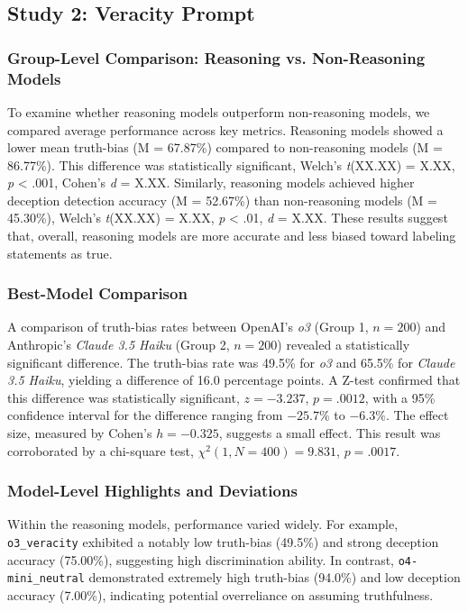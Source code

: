 \documentclass{article}
\begin{document}
\subsection{Study 2: Veracity Prompt}

\subsubsection{Group-Level Comparison: Reasoning vs. Non-Reasoning Models}

To examine whether reasoning models outperform non-reasoning models, we compared average performance across key metrics. Reasoning models showed a lower mean truth-bias (M = 67.87\%) compared to non-reasoning models (M = 86.77\%). This difference was statistically significant, Welch's \textit{t}(XX.XX) = X.XX, \textit{p} < .001, Cohen's \textit{d} = X.XX. Similarly, reasoning models achieved higher deception detection accuracy (M = 52.67\%) than non-reasoning models (M = 45.30\%), Welch's \textit{t}(XX.XX) = X.XX, \textit{p} < .01, \textit{d} = X.XX. These results suggest that, overall, reasoning models are more accurate and less biased toward labeling statements as true.

\subsubsection{Best-Model Comparison}

A comparison of truth-bias rates between OpenAI's \textit{o3} (Group 1, $n = 200$) and Anthropic's \textit{Claude 3.5 Haiku} (Group 2, $n = 200$) revealed a statistically significant difference. The truth-bias rate was 49.5\% for \textit{o3} and 65.5\% for \textit{Claude 3.5 Haiku}, yielding a difference of 16.0 percentage points. A Z-test confirmed that this difference was statistically significant, $z = -3.237$, $p = .0012$, with a 95\% confidence interval for the difference ranging from $-25.7\%$ to $-6.3\%$. The effect size, measured by Cohen’s $h = -0.325$, suggests a small effect. This result was corroborated by a chi-square test, $\chi^2(1, N = 400) = 9.831$, $p = .0017$.

\subsubsection{Model-Level Highlights and Deviations}

Within the reasoning models, performance varied widely. For example, \texttt{o3\_veracity} exhibited a notably low truth-bias (49.5\%) and strong deception accuracy (75.00\%), suggesting high discrimination ability. In contrast, \texttt{o4-mini\_neutral} demonstrated extremely high truth-bias (94.0\%) and low deception accuracy (7.00\%), indicating potential overreliance on assuming truthfulness.
\end{document}
